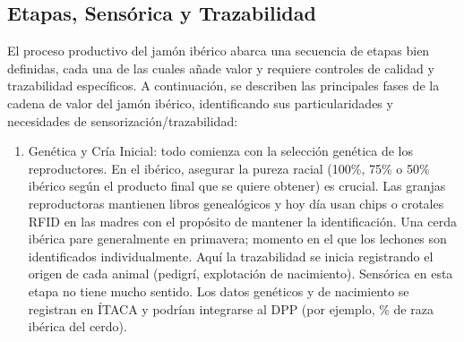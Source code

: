 \subsection{Etapas, Sensórica y Trazabilidad}
El proceso productivo del jamón ibérico abarca una secuencia de etapas bien definidas, cada una de las cuales añade valor y requiere controles de calidad y trazabilidad específicos. A continuación, se describen las principales fases de la cadena de valor del jamón ibérico, identificando sus particularidades y necesidades de sensorización/trazabilidad:
\begin{enumerate}
	\item Genética y Cría Inicial: todo comienza con la selección genética de los reproductores. En el ibérico, asegurar la pureza racial (100\%, 75\% o 50\% ibérico según el producto final que se quiere obtener) es crucial. Las granjas reproductoras mantienen libros genealógicos y hoy día usan chips o crotales RFID en las madres con el propósito de mantener la identificación. Una cerda ibérica pare generalmente en primavera; momento en el que los lechones son identificados individualmente. Aquí la trazabilidad se inicia registrando el origen de cada animal (pedigrí, explotación de nacimiento). Sensórica en esta etapa no tiene mucho sentido. Los datos genéticos y de nacimiento se registran en ÍTACA y podrían integrarse al DPP (por ejemplo, \% de raza ibérica del cerdo).

\end{enumerate}
